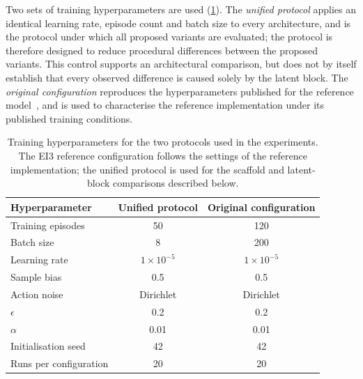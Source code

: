 \documentclass[aps,floatfix,superscriptaddress,twocolumn,tightenlines,amsmath,amssymb,nofootinbib,10pt,longbibliography,prl]{revtex4-2}
\begin{document}
Two sets of training hyperparameters are used (\ref{tab:hyperparams}). The \emph{unified protocol} applies an identical learning rate, episode count and batch size to every architecture, and is the protocol under which all proposed variants are evaluated; the protocol is therefore designed to reduce procedural differences between the proposed variants. This control supports an architectural comparison, but does not by itself establish that every observed difference is caused solely by the latent block. The \emph{original configuration} reproduces the hyperparameters published for the reference model~\cite{RLportfolio}, and is used to characterise the reference implementation under its published training conditions.


\begin{table}[htbp]
  \centering
  \caption{Training hyperparameters for the two protocols used in the experiments. The EI3 reference configuration follows the settings of the reference implementation; the unified protocol is used for the scaffold and latent-block comparisons described below.}
  \label{tab:hyperparams}
  \begin{tabular}{lcc}
    \toprule
    Hyperparameter & Unified protocol & Original configuration \\
    \midrule
    Training episodes      & 50                & 120 \\
    Batch size             & 8                 & 200 \\
    Learning rate          & $1\times10^{-5}$  & $1\times10^{-5}$ \\
    Sample bias            & 0.5               & 0.5 \\
    Action noise           & Dirichlet         & Dirichlet \\
    \quad $\epsilon$       & 0.2               & 0.2 \\
    \quad $\alpha$         & 0.01              & 0.01 \\
    Initialisation seed    & 42                & 42 \\
    Runs per configuration & 20                & 20 \\
    \bottomrule
  \end{tabular}
  \\[3pt]
\end{table}
\end{document}
